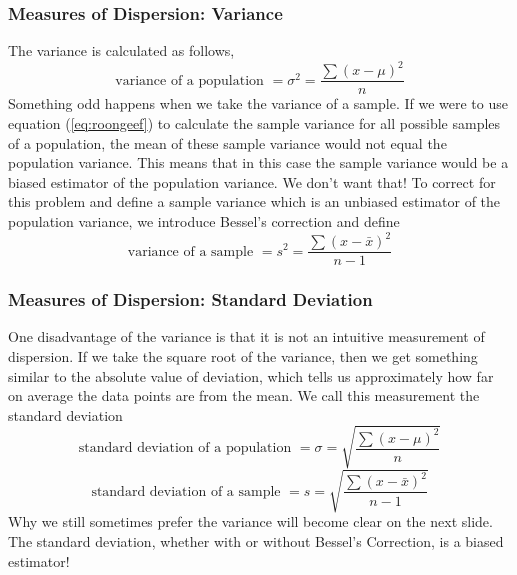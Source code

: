 \documentclass[xcolor=dvipsnames]{beamer}
\begin{document}
\begin{frame}
  \frametitle{Measures of Dispersion: Variance}
The \alert{variance} is calculated as follows,
\begin{equation}
  \label{eq:roongeef}
   \mbox{variance of a population }=\sigma^{2}=\frac{\sum{}(x-\mu)^{2}}{n}
\end{equation}
Something odd happens when we take the variance of a sample. If we
were to use equation (\ref{eq:roongeef}) to calculate the sample
variance for all possible samples of a population, the mean of these
sample variance would not equal the population variance. This means
that in this case the sample variance would be a \alert{biased
  estimator} of the population variance. We don't want that! To
correct for this problem and define a sample variance which is an
\alert{unbiased estimator} of the population variance, we introduce
\alert{Bessel's correction} and define
\begin{equation}
  \label{eq:ilosoama}
   \mbox{variance of a sample }=s^{2}=\frac{\sum{}(x-\bar{x})^{2}}{n-1}
\end{equation}
\end{frame}

\begin{frame}
  \frametitle{Measures of Dispersion: Standard Deviation}
One disadvantage of the variance is that it is not an intuitive
measurement of dispersion. If we take the square root of the variance,
then we get something similar to the absolute value of deviation,
which tells us approximately how far on average the data points are
from the mean. We call this measurement the \alert{standard
  deviation}
\begin{equation}
  \label{eq:boolaesh}
   \mbox{standard deviation of a population }=\sigma=\sqrt{\frac{\sum{}(x-\mu)^{2}}{n}}
\end{equation}
\begin{equation}
  \label{eq:xeiroong}
   \mbox{standard deviation of a sample }=s=\sqrt{\frac{\sum{}(x-\bar{x})^{2}}{n-1}}
\end{equation}
Why we still sometimes prefer the variance will become
clear on the next slide. The standard deviation, whether with or
without Bessel's Correction, is a biased estimator!
\end{frame}
\end{document}
